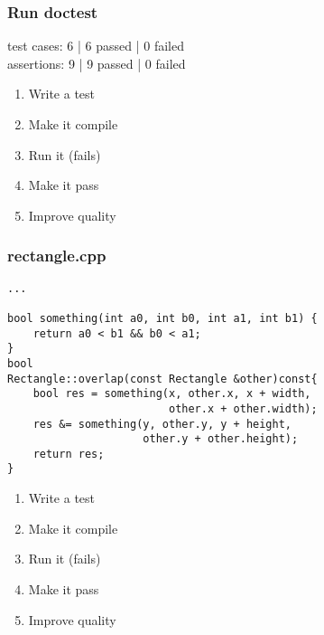 \begin{frame}[fragile]
\frametitle{Run doctest}
\begin{minipage}[t]{0.48\linewidth}
test cases: 6 | 6 passed | 0 failed\\
assertions: 9 | 9 passed | 0 failed\\
\end{minipage}\hfill
\begin{minipage}[t]{0.28\linewidth}
  \small
  \begin{enumerate} 
    \item \textcolor{deadcolor}{Write a test}
    \item \textcolor{deadcolor}{Make it compile}
    \item \textcolor{deadcolor}{Run it (fails)}
    \item \textcolor{deadcolor}{Make it pass}
    \item \textcolor{activecolor}{Improve quality}
  \end{enumerate} 
\end{minipage}
\end{frame}


\begin{frame}[fragile]
\frametitle{rectangle.cpp}
\begin{minipage}[t]{0.48\linewidth}
\begin{lstlisting}
...

bool something(int a0, int b0, int a1, int b1) {
    return a0 < b1 && b0 < a1;
}
bool 
Rectangle::overlap(const Rectangle &other)const{
    bool res = something(x, other.x, x + width, 
                         other.x + other.width);
    res &= something(y, other.y, y + height, 
                     other.y + other.height);
    return res;
}
\end{lstlisting}
\end{minipage}\hfill
\begin{minipage}[t]{0.28\linewidth}
  \small
  \begin{enumerate} 
    \item \textcolor{deadcolor}{Write a test}
    \item \textcolor{deadcolor}{Make it compile}
    \item \textcolor{deadcolor}{Run it (fails)}
    \item \textcolor{deadcolor}{Make it pass}
    \item \textcolor{activecolor}{Improve quality}
  \end{enumerate} 
\end{minipage}
\end{frame}


